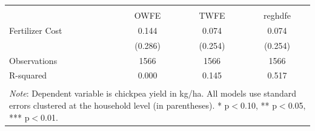 \begin{tabular}{l*{3}{c}} 
\\[-1.8ex]\hline \hline \\[-1.8ex] 
& \multicolumn{1}{c}{OWFE} & 
\multicolumn{1}{c}{TWFE} & 
\multicolumn{1}{c}{reghdfe} \\ \midrule
\midrule
Fertilizer Cost     &       0.144         &       0.074         &       0.074         \\
                    &     (0.286)         &     (0.254)         &     (0.254)         \\
\midrule
Observations        &        1566         &        1566         &        1566         \\
R-squared           &       0.000         &       0.145         &       0.517         \\
\hline \hline \\[-1.8ex] 
\multicolumn{4}{p{\linewidth}}{\small 
\noindent \textit{Note}: Dependent variable 
is chickpea yield in kg/ha. All models use 
standard errors clustered at the 
household level (in parentheses). 
* p$<$0.10, ** p$<$0.05, *** p$<$0.01.} 
\end{tabular}
